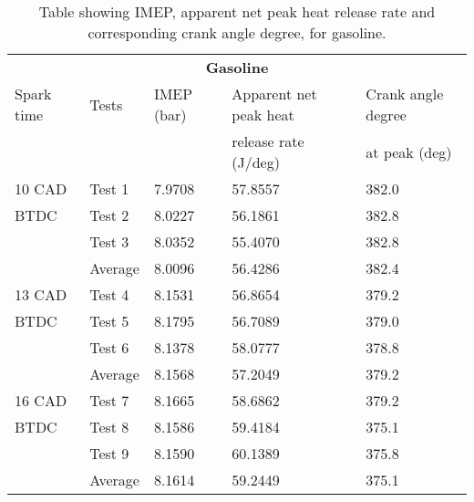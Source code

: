 \begin{table}[H]
    \begin{center}
        \begin{tabular}{@{}l l l l l@{}}
            \toprule
            \multicolumn{5}{c}{\textbf{Gasoline}}                                                   \\
            Spark time & Tests   & IMEP (bar) & Apparent net peak heat         & Crank angle degree \\
                       &         &            & release rate (\si{\joule}/deg) & at peak (deg)      \\
            \midrule
            10 CAD     & Test 1  & 7.9708     & 57.8557                        & 382.0              \\
            BTDC       & Test 2  & 8.0227     & 56.1861                        & 382.8              \\
                       & Test 3  & 8.0352     & 55.4070                        & 382.8              \\
                       & Average & 8.0096     & 56.4286                        & 382.4              \\
            13 CAD     & Test 4  & 8.1531     & 56.8654                        & 379.2              \\
            BTDC       & Test 5  & 8.1795     & 56.7089                        & 379.0              \\
                       & Test 6  & 8.1378     & 58.0777                        & 378.8              \\
                       & Average & 8.1568     & 57.2049                        & 379.2              \\
            16 CAD     & Test 7  & 8.1665     & 58.6862                        & 379.2              \\
            BTDC       & Test 8  & 8.1586     & 59.4184                        & 375.1              \\
                       & Test 9  & 8.1590     & 60.1389                        & 375.8              \\
                       & Average & 8.1614     & 59.2449                        & 375.1              \\
            \bottomrule
        \end{tabular}
        \caption{Table showing IMEP, apparent net peak heat release rate and corresponding crank angle degree, for gasoline.}
        \label{q1-t1}
    \end{center}
\end{table}
